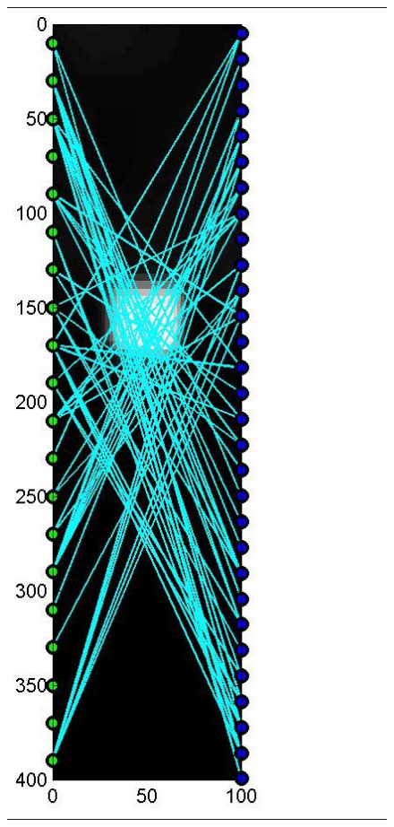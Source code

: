 \documentclass[english]{siamltex}
\begin{document}
{\begin{figure}[!h]
\begin{center}
\begin{tabular}{|c|c|c|c|c|c|c|c|c|}
			\includegraphics[width=.9\iwidth]{figures/newFigs/noisy/resultsExp-3-designs}
			&

\end{tabular}
\end{center}
\end{figure}}
\end{document}
